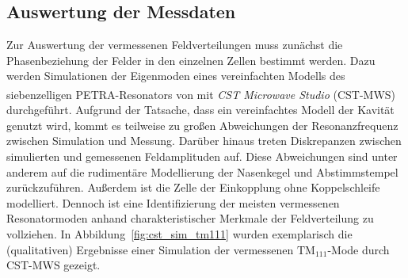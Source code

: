 \subsection{Auswertung der Messdaten}
Zur Auswertung der vermessenen Feldverteilungen muss zunächst die Phasenbeziehung der Felder in den einzelnen Zellen bestimmt werden.
Dazu werden Simulationen der Eigenmoden eines vereinfachten Modells des siebenzelligen PETRA-Resonators von \cite{schedler_pm} mit \textit{CST Microwave Studio\textsuperscript{\textregistered}} (CST-MWS) durchgeführt.
Aufgrund der Tatsache, dass ein vereinfachtes Modell der Kavität genutzt wird, kommt es teilweise zu großen Abweichungen der Resonanzfrequenz zwischen Simulation und Messung.
Darüber hinaus treten Diskrepanzen zwischen simulierten und gemessenen Feldamplituden auf.
Diese Abweichungen sind unter anderem auf die rudimentäre Modellierung der Nasenkegel und Abstimmstempel zurückzuführen.
Außerdem ist die Zelle der Einkopplung ohne Koppelschleife modelliert.
Dennoch ist eine Identifizierung der meisten vermessenen Resonatormoden anhand charakteristischer Merkmale der Feldverteilung zu vollziehen.
In Abbildung~\ref{fig:cst_sim_tm111} wurden exemplarisch die (qualitativen) Ergebnisse einer Simulation der vermessenen $\mathrm{TM}_{111}$-Mode durch CST-MWS gezeigt. 
